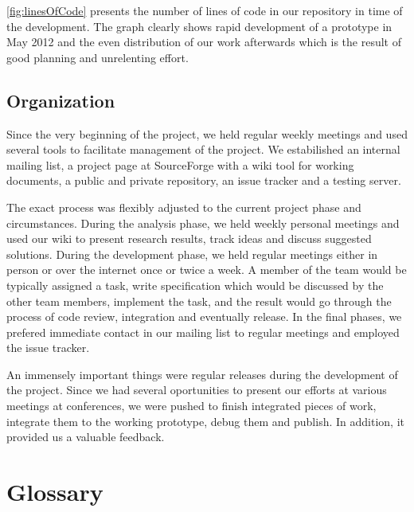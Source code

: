 \figurename \ref{fig:linesOfCode} presents the number of lines of code in our repository in time of the development. The graph clearly shows rapid development of a prototype in May 2012 and the even distribution of our work afterwards which is the result of good planning and unrelenting effort.

\section*{Organization}
Since the very beginning of the project, we held regular weekly meetings and used several tools to facilitate management of the project. We estabilished an internal mailing list, a project page at SourceForge with a wiki tool for working documents, a public and private repository, an issue tracker and a testing server.

The exact process was flexibly adjusted to the current project phase and circumstances. During the analysis phase,  we held weekly personal meetings and used our wiki to present research results, track ideas and discuss suggested solutions. During the development phase, we held regular meetings either in person or over the internet once or twice a week. A member of the team would be typically assigned a task, write specification which would be discussed by the other team members, implement the task, and the result would go through the process of code review, integration and eventually release. In the final phases, we prefered immediate contact in our mailing list to regular meetings and employed the issue tracker.

An immensely important things were regular releases during the development of the project. Since we had several oportunities to present our efforts at various meetings at conferences, we were pushed to finish integrated pieces of work, integrate them to the working prototype, debug them and publish. In addition, it provided us a valuable feedback.

\chapter{Glossary}
\label{chap:glossary}



